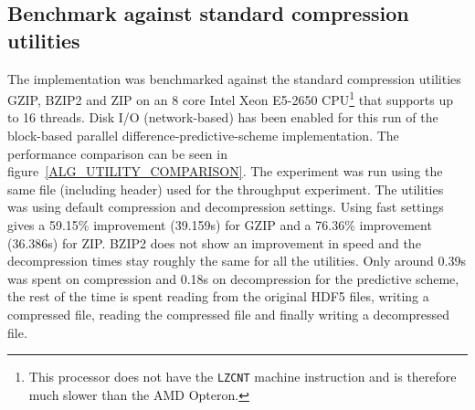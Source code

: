 \subsection{Benchmark against standard compression utilities}
The implementation was benchmarked against the standard compression utilities GZIP, BZIP2 and ZIP on an 8 core Intel Xeon E5-2650 CPU\footnote{This processor does not have 
the \texttt{LZCNT} machine instruction and is therefore much slower than the AMD Opteron.} that supports up to 16 threads. 
Disk I/O (network-based) has been enabled for this run of the block-based parallel difference-predictive-scheme implementation. The performance comparison can be seen
in figure~\ref{ALG_UTILITY_COMPARISON}. The experiment was run using the same file (including header) used for the throughput experiment. The utilities was using default compression 
and decompression settings. Using fast settings gives a 59.15\% improvement (39.159s) for GZIP and a 76.36\% improvement (36.386s) for ZIP. BZIP2 does not show an improvement 
in speed and the decompression times stay roughly the same for all the utilities.  Only around 0.39s was spent on compression and 0.18s on decompression for the predictive scheme, 
the rest of the time is spent reading from the original HDF5 files, writing a compressed file, reading the compressed file and finally writing a decompressed file.
